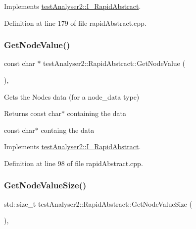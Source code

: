 Implements \mbox{\hyperlink{classtestAnalyser2_1_1I__RapidAbstract_a8da0bb607ddd98b943fc07fd5ac1abe8}{test\+Analyser2\+::\+I\+\_\+\+Rapid\+Abstract}}.



Definition at line 179 of file rapid\+Abstract.\+cpp.

\mbox{\label{classtestAnalyser2_1_1RapidAbstract_a80bd2529fc3b0d6678a166d3192d4a60}} 
\subsubsection{\texorpdfstring{GetNodeValue()}{GetNodeValue()}}
{\footnotesize\ttfamily const char $\ast$ test\+Analyser2\+::\+Rapid\+Abstract\+::\+Get\+Node\+Value (\begin{DoxyParamCaption}{ }\end{DoxyParamCaption})\hspace{0.3cm}{\ttfamily [override]}, {\ttfamily [virtual]}}



Gets the Node\textquotesingle{}s data (for a node\+\_\+data type) 

\begin{DoxyReturn}{Returns}
const char$\ast$ containing the data

const char$\ast$ containg the data 
\end{DoxyReturn}


Implements \mbox{\hyperlink{classtestAnalyser2_1_1I__RapidAbstract_a0d4dd17120e75549ee68181cc4a4e503}{test\+Analyser2\+::\+I\+\_\+\+Rapid\+Abstract}}.



Definition at line 98 of file rapid\+Abstract.\+cpp.

\mbox{\label{classtestAnalyser2_1_1RapidAbstract_a04603ede543eac5c9c76050cbfe768db}} 
\subsubsection{\texorpdfstring{GetNodeValueSize()}{GetNodeValueSize()}}
{\footnotesize\ttfamily std\+::size\+\_\+t test\+Analyser2\+::\+Rapid\+Abstract\+::\+Get\+Node\+Value\+Size (\begin{DoxyParamCaption}{ }\end{DoxyParamCaption})\hspace{0.3cm}{\ttfamily [override]}, {\ttfamily [virtual]}}



